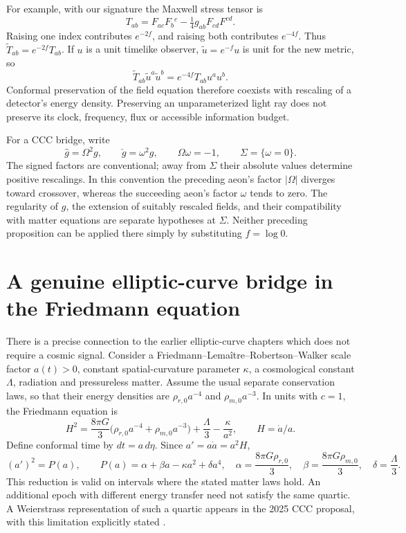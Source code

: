 For example, with our signature the Maxwell stress tensor is
\[
 T_{ab}=F_{ac}F_b{}^c-\tfrac14 g_{ab}F_{cd}F^{cd}.
\]
Raising one index contributes $e^{-2f}$, and raising both contributes
$e^{-4f}$. Thus $\widetilde T_{ab}=e^{-2f}T_{ab}$. If $u$ is a unit
timelike observer, $\widetilde u=e^{-f}u$ is unit for the new metric, so
\[
 \widetilde T_{ab}\widetilde u^a\widetilde u^b
 =e^{-4f}T_{ab}u^a u^b.
\]
Conformal preservation of the field equation therefore coexists with
rescaling of a detector's energy density. Preserving an unparameterized
light ray does not preserve its clock, frequency, flux or accessible
information budget.

For a CCC bridge, write
\begin{equation}
 \widehat g=\Omega^2g,\qquad \check g=\omega^2g,\qquad
 \Omega\omega=-1,\qquad \Sigma=\{\omega=0\}.
 \label{eq:cc-bridge}
\end{equation}
The signed factors are conventional; away from $\Sigma$ their absolute
values determine positive rescalings. In this convention the preceding
aeon's factor $|\Omega|$ diverges toward crossover, whereas the succeeding
aeon's factor $\omega$ tends to zero. The regularity of $g$, the extension
of suitably rescaled fields, and their compatibility with matter equations
are separate hypotheses at $\Sigma$. Neither preceding proposition can
be applied there simply by substituting $f=\log 0$.

\section{A genuine elliptic-curve bridge in the Friedmann equation}

There is a precise connection to the earlier elliptic-curve chapters which
does not require a cosmic signal. Consider a Friedmann--Lema\^{i}tre--Robertson--Walker
scale factor $a(t)>0$, constant spatial-curvature parameter $\kappa$, a
cosmological constant $\Lambda$, radiation and pressureless matter. Assume
the usual separate conservation laws, so that their energy densities are
$\rho_{r,0}a^{-4}$ and $\rho_{m,0}a^{-3}$. In units with $c=1$, the
Friedmann equation is
\[
 H^2=\frac{8\pi G}{3}
 \bigl(\rho_{r,0}a^{-4}+\rho_{m,0}a^{-3}\bigr)
 +\frac{\Lambda}{3}-\frac{\kappa}{a^2},\qquad H=\dot a/a.
\]
Define conformal time by $dt=a\,d\eta$. Since $a'=a\dot a=a^2H$,
\begin{equation}
 (a')^2=P(a),\qquad
 P(a)=\alpha+\beta a-\kappa a^2+\delta a^4,
 \quad \alpha=\frac{8\pi G\rho_{r,0}}3,
 \quad\beta=\frac{8\pi G\rho_{m,0}}3,
 \quad\delta=\frac\Lambda3.
 \label{eq:cc-friedmann}
\end{equation}
This reduction is valid on intervals where the stated matter laws hold.
An additional epoch with different energy transfer need not satisfy the
same quartic. A Weierstrass representation of such a quartic appears in
the 2025 CCC proposal, with this limitation explicitly stated
\citep[Sec.~V, especially p.~13]{CCMeissnerPenrose2025}.

